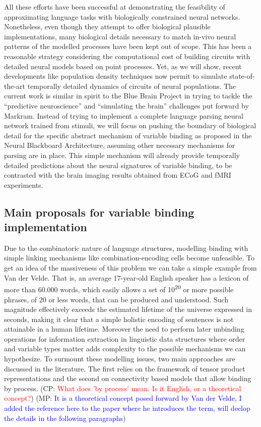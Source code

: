 \documentclass[10pt]{article}
\newcommand{\noteCP}[1]{(CP: \textcolor{red}{#1})}
\newcommand{\noteMP}[2]{(MP: \textcolor{blue}{#1})}
\begin{document}
All these efforts have been successful at demonstrating the feasibility of approximating language tasks with biologically constrained neural networks.
Nonetheless, even though they attempt to offer biological plausible implementations, many biological details necessary to match in-vivo neural patterns of the modelled processes have been kept out of scope.
This has been a reasonable strategy considering the computational cost of building circuits with detailed neural models based on point processes.
Yet, as we will show, recent developments like population density
techniques\cite{de2013generica} now permit to simulate state-of-the-art temporally detailed dynamics of circuits of neural populations.
The current work is similar in spirit to the Blue Brain Project\cite{Markram_2006} in trying to tackle the ``predictive neuroscience'' and ``simulating the brain'' challenges put forward by Markram\cite{markram2013seven}.
Instead of trying to implement a complete language parsing neural network trained from stimuli, we will focus on pushing the boundary of biological detail for the specific abstract mechanism of variable binding as proposed in the Neural Blackboard Architecture\cite{van_der_Velde_2006}, assuming other necessary mechanisms for parsing are in place.
This simple mechanism will already provide temporally detailed predictions about the neural signatures of variable binding, to be contrasted with the brain imaging results obtained from ECoG and fMRI experiments.

\subsection{Main proposals for variable binding implementation}

{\label{946708}}

Due to the combinatoric nature of language structures, modelling binding with simple linking mechanisms like combination-encoding cells become unfeasible\cite{von_der_Malsburg_1999}.
To get an idea of the massiveness of this problem we can take a simple example from Van der Velde\cite{van_der_Velde_2006}.
That is, an average 17-year-old English speaker has a lexicon of more than 60.000 words, which easily allows a set of 10\textsuperscript{20} or more possible phrases, of 20 or less words, that can be produced and understood.
Such magnitude effectively exceeds the estimated lifetime of the universe expressed in seconds, making it clear that a simple holistic encoding of sentences is not attainable in a human lifetime.
Moreover the need to perform later unbinding operations for information extraction in linguistic data structures where order and variable types matter adds complexity to the possible mechanisms we can hypothesize.
To surmount these modelling issues, two main approaches are discussed in the literature.
The first relies on the framework of tensor product representations\cite{smolensky2006harmonic} and the second on connectivity based models that allow binding by process\cite{van_der_Velde_2015}.
\noteCP{What does 'by process' mean. Is it English, or a theoretical concept?}
\noteMP{It is a theoretical concept posed forward by Van der Velde, I added the reference here to the paper where he introduces the term, will deelop the details in the following paragraphs}.
\end{document}
